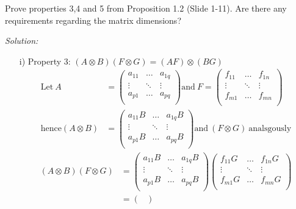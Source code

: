 \documentclass[12pt,a4paper]{article}
\begin{document}
Prove properties 3,4 and 5 from Proposition 1.2 (Slide 1-11). Are there
any requirements regarding the matrix dimensions?

\emph{Solution:}\\

\begin{itemize}
    \item[i)] Property 3: $(A \otimes B)(F \otimes G) = (AF) \otimes (BG)$
    \begin{align*}
      \text{Let} \ A & = 
      \begin{pmatrix}
      a_{11} & \ldots & a_{1q}\\
      \vdots & \ddots & \vdots \\
      a_{p1} & \ldots & a_{pq}\\
      \end{pmatrix}
      \text{and} \ F = 
      \begin{pmatrix}
      f_{11} & \ldots & f_{1n}\\
      \vdots & \ddots & \vdots \\
      f_{m1} & \ldots & f_{mn}\\
      \end{pmatrix}\\
      \text{hence} (A \otimes B) & = 
      \begin{pmatrix}
      a_{11}B & \ldots & a_{1q}B\\
      \vdots & \ddots & \vdots \\
      a_{p1}B & \ldots & a_{pq}B\\
      \end{pmatrix}
      \text{and} \ (F \otimes G) \ \text{analsgously}
    \end{align*}
    \begin{align*}
    (A \otimes B)(F \otimes G) & = 
    \begin{pmatrix}
      a_{11}B & \ldots & a_{1q}B\\
      \vdots & \ddots & \vdots \\
      a_{p1}B & \ldots & a_{pq}B\\
    \end{pmatrix}
    \begin{pmatrix}
      f_{11}G & \ldots & f_{1n}G\\
      \vdots & \ddots & \vdots \\
      f_{m1}G & \ldots & f_{mn}G\\
    \end{pmatrix}\\
    & = 
    \begin{pmatrix}

\end{pmatrix}
\end{align*}
\end{itemize}
\end{document}
